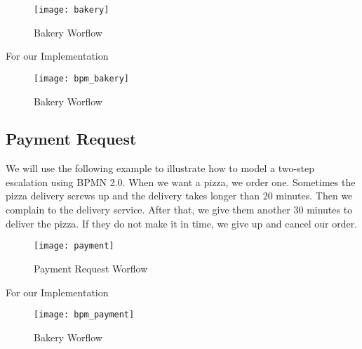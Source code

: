 \begin{figure}[h]
    \texttt{[image: bakery]}
    \centering
    \caption{Bakery Worflow}
    \label{fig:bakery}
\end{figure}

For our Implementation
\begin{figure}[h]
    \texttt{[image: bpm\_bakery]}
    \centering
    \caption{Bakery Worflow}
    \label{fig:bpm_bakery}
\end{figure}



\subsection{Payment Request}
We will use the following example to illustrate how to model a two-step escalation using BPMN 2.0.
When we want a pizza, we order one. Sometimes the pizza delivery screws up and the delivery takes
longer than 20 minutes. Then we complain to the delivery service. After that, we give them another 30
minutes to deliver the pizza. If they do not make it in time, we give up and cancel our order.

\begin{figure}[h]
    \texttt{[image: payment]}
    \centering
    \caption{Payment Request Worflow}
    \label{fig:payment}
\end{figure}

For our Implementation
\begin{figure}[h]
    \texttt{[image: bpm\_payment]}
    \centering
    \caption{Bakery Worflow}
    \label{fig:bpm_payment}
\end{figure}